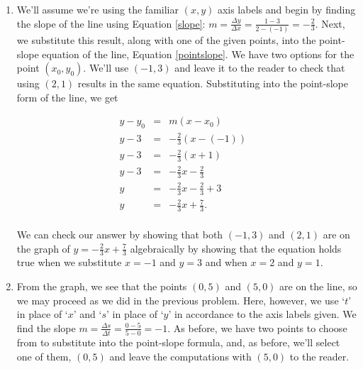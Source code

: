 \documentclass{ximera}
\begin{document}
\begin{example}
\begin{enumerate}
\begin{center}
\end{center}

\item We'll assume we're using the familiar $(x,y)$ axis labels and begin by finding the slope of the line using Equation \ref{slope}:  $m = \frac{\Delta y}{\Delta x} = \frac{1 - 3}{2 - (-1)} = -\frac{2}{3}$.  Next, we substitute this result, along with one of the given points, into the point-slope equation of the line, Equation \ref{pointslope}. We have two options for the point $\left(x_0, y_0\right)$. We'll use $(-1,3)$ and leave it to the reader to check that using $(2,1)$ results in the same equation.  Substituting into the point-slope form of the line, we get 


\setlength{\extrarowheight}{10pt}
\[\begin{array}{rclr} 
y - y_0 & = & m\left(x - x_0\right)  & \\
y - 3 & = & -\frac{2}{3} \left(x - (-1)\right) & \\
y - 3 & = & -\frac{2}{3} \left(x +1 \right) & \\
y - 3& = & -\frac{2}{3}x - \frac{2}{3}\\
y& = & -\frac{2}{3}x - \frac{2}{3} + 3\\
y & = & -\frac{2}{3} x + \frac{7}{3}. \\ 
\end{array} \]

We can check our answer by showing that both $(-1,3)$ and $(2,1)$ are on the graph of $y  =  -\frac{2}{3} x + \frac{7}{3}$ algebraically by showing that the equation holds true when we substitute $x = -1$ and $y=3$ and when $x = 2$ and $y = 1$.

\item  From the graph, we see that the points $(0,5)$ and $(5,0)$ are on the line, so we may proceed as we did in the previous problem.  Here, however,  we use `$t$' in place of `$x$' and `$s$' in place of `$y$' in accordance to the axis labels given.  We find the slope $m = \frac{\Delta s}{\Delta t} = \frac{0 - 5}{5 - 0} = -1$.  As before, we have two points to choose from to substitute into the point-slope formula, and, as before, we'll select one of them, $(0,5)$ and leave the computations with $(5,0)$ to the reader.  


\end{enumerate}
\end{example}
\end{document}
